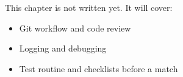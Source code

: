 \label{ch:rc3}
\begin{keyidea}
This chapter is not written yet. It will cover:
\begin{itemize}[nosep]
  \item Git workflow and code review
  \item Logging and debugging
  \item Test routine and checklists before a match
\end{itemize}
\end{keyidea}
